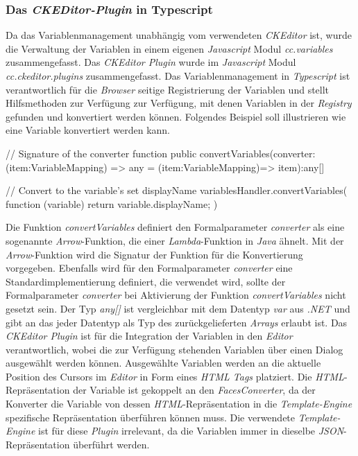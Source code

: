\subsubsection{Das \emph{CKEDitor-Plugin} in Typescript}
Da das Variablenmanagement unabhängig vom verwendeten \emph{CKEditor} ist, wurde die Verwaltung der Variablen in einem eigenen \emph{Javascript} Modul \emph{cc.variables} zusammengefasst. Das \emph{CKEditor Plugin} wurde im \emph{Javascript} Modul \emph{cc.ckeditor.plugins} zusammengefasst. Das Variablenmanagement in \emph{Typescript} ist verantwortlich für die \emph{Browser} seitige Registrierung der Variablen und stellt Hilfsmethoden zur Verfügung zur Verfügung, mit denen Variablen in der \emph{Registry} gefunden und konvertiert werden können. Folgendes Beispiel soll illustrieren wie eine Variable konvertiert werden kann.
\begin{JsCode}[numbers=none]
// Signature of the converter function
public convertVariables(converter:(item:VariableMapping) => any 
                        = (item:VariableMapping)=> item):any[]

// Convert to the variable's set displayName
variablesHandler.convertVariables(
	function (variable) {
		return variable.displayName;
	}
)                        
\end{JsCode}
Die Funktion \emph{convertVariables} definiert den Formalparameter \emph{converter} als eine sogenannte \emph{Arrow}-Funktion, die einer \emph{Lambda}-Funktion in \emph{Java} ähnelt. Mit der \emph{Arrow}-Funktion wird die Signatur der Funktion für die Konvertierung vorgegeben. Ebenfalls wird für den Formalparameter \emph{converter} eine Standardimplementierung definiert, die verwendet wird, sollte der Formalparameter \emph{converter} bei Aktivierung der Funktion \emph{convertVariables} nicht gesetzt sein. Der Typ \emph{any[]} ist vergleichbar mit dem Datentyp \emph{var} aus \emph{.NET} und gibt an das jeder Datentyp als Typ des zurückgelieferten \emph{Arrays} erlaubt ist.
\newline
\newline
Das \emph{CKEditor Plugin} ist für die Integration der Variablen in den \emph{Editor} verantwortlich, wobei die zur Verfügung stehenden Variablen über einen Dialog ausgewählt werden können. Ausgewählte Variablen werden an die aktuelle Position des Cursors im \emph{Editor} in Form eines \emph{HTML Tags} platziert. Die \emph{HTML}-Repräsentation der Variable ist gekoppelt an den \emph{FacesConverter}, da der Konverter die Variable von dessen \emph{HTML}-Repräsentation in die \emph{Template-Engine} spezifische Repräsentation überführen können muss. Die verwendete \emph{Template-Engine} ist für diese \emph{Plugin} irrelevant, da die Variablen immer in dieselbe \emph{JSON}-Repräsentation überführt werden.
